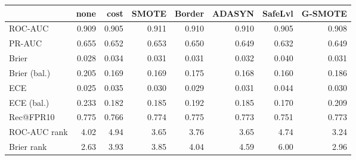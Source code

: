 \begin{tabular}{lrrrrrrr}
\toprule
 & none & cost & SMOTE & Border & ADASYN & SafeLvl & G-SMOTE \\
\midrule
ROC-AUC & 0.909 & 0.905 & 0.911 & 0.910 & 0.910 & 0.905 & 0.908 \\
PR-AUC & 0.655 & 0.652 & 0.653 & 0.650 & 0.649 & 0.632 & 0.649 \\
Brier & 0.028 & 0.034 & 0.031 & 0.031 & 0.032 & 0.040 & 0.031 \\
Brier (bal.) & 0.205 & 0.169 & 0.169 & 0.175 & 0.168 & 0.160 & 0.186 \\
ECE & 0.025 & 0.035 & 0.030 & 0.029 & 0.031 & 0.044 & 0.030 \\
ECE (bal.) & 0.233 & 0.182 & 0.185 & 0.192 & 0.185 & 0.170 & 0.209 \\
Rec@FPR10 & 0.775 & 0.766 & 0.774 & 0.775 & 0.773 & 0.751 & 0.773 \\
ROC-AUC rank & 4.02 & 4.94 & 3.65 & 3.76 & 3.65 & 4.74 & 3.24 \\
Brier rank & 2.63 & 3.93 & 3.85 & 4.04 & 4.59 & 6.00 & 2.96 \\
\bottomrule
\end{tabular}
